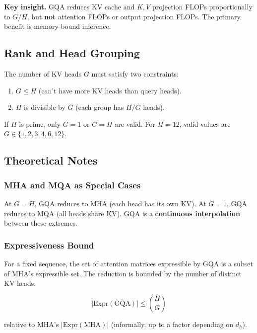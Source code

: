 \textbf{Key insight.} GQA reduces KV cache and $K, V$ projection FLOPs proportionally 
to $G / H$, but \textbf{not} attention FLOPs or output projection FLOPs. The primary 
benefit is memory-bound inference.

\subsection{Rank and Head Grouping}

The number of KV heads $G$ must satisfy two constraints:

\begin{enumerate}
\item $G \le H$ (can't have more KV heads than query heads).
\item $H$ is divisible by $G$ (each group has $H / G$ heads).

\end{enumerate}
If $H$ is prime, only $G = 1$ or $G = H$ are valid. For $H = 12$, valid values 
are $G \in \{1, 2, 3, 4, 6, 12\}$.

\subsection{Theoretical Notes}

\subsubsection{MHA and MQA as Special Cases}

At $G = H$, GQA reduces to MHA (each head has its own KV). At $G = 1$, GQA 
reduces to MQA (all heads share KV). GQA is a \textbf{continuous interpolation} 
between these extremes.

\subsubsection{Expressiveness Bound}

For a fixed sequence, the set of attention matrices expressible by GQA is a 
subset of MHA's expressible set. The reduction is bounded by the number of 
distinct KV heads:

\[
|\text{Expr}(\text{GQA})| \le \binom{H}{G}
\tag{4.8}
\]

relative to MHA's $|\text{Expr}(\text{MHA})|$ (informally, up to a 
factor depending on $d_h$).